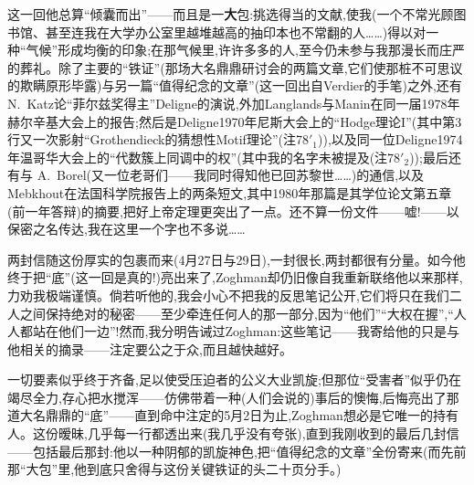 这一回他总算“倾囊而出”——而且是一\textbf{大}包:挑选得当的文献,使我(一个不常光顾图书馆、甚至连我在大学办公室里越堆越高的抽印本也不常翻的人……)得以对一种“气候”形成均衡的印象;在那气候里,许许多多的人,至今仍未参与我那漫长而庄严的葬礼。除了主要的“铁证”(那场大名鼎鼎研讨会的两篇文章,它们使那桩不可思议的欺瞒原形毕露)与另一篇“值得纪念的文章”(这一回出自Verdier的手笔)之外,还有 N.~Katz论“菲尔兹奖得主”Deligne的演说,外加Langlands与Manin在同一届1978年赫尔辛基大会上的报告;然后是Deligne1970年尼斯大会上的“Hodge理论I”(其中第3行又一次影射“Grothendieck的猜想性Motif理论”(注78$'_{1}$))\dmark{},以及同一位Deligne1974年温哥华大会上的“代数簇上同调中的权”(其中我的名字未被提及(注78$'_{2}$));最后还有与 A.~Borel(又一位老哥们——我同时得知他已回苏黎世……)的通信,以及Mebkhout在法国科学院报告上的两条短文,其中1980年那篇是其学位论文第五章(前一年答辩)的摘要,把好上帝定理更突出了一点。还不算一份文件——嘘!——以保密之名传达,我在这里一个字也不多说……

两封信随这份厚实的包裹而来(4月27日与29日),一封很长,两封都很有分量。如今他终于把“底”(这一回是真的!)亮出来了,Zoghman却仍旧像自我重新联络他以来那样,力劝我极端谨慎。倘若听他的,我会小心不把我的反思笔记公开,它们将只在我们二人之间保持绝对的秘密——至少牵连任何人的那一部分,因为“他们”“大权在握”,“人人都站在他们一边”!然而,我分明告诫过Zoghman:这些笔记——我寄给他的只是与他相关的摘录——注定要公之于众,而且越快越好。

一切要素似乎终于齐备,足以使受压迫者的公义大业凯旋;但那位“受害者”似乎仍在竭尽全力,存心把水搅浑——仿佛带着一种(人们会说的)事后的懊悔,后悔亮出了那道大名鼎鼎的“底”——直到命中注定的5月2日为止,Zoghman想必是它唯一的持有人。这份暧昧,几乎每一行都透出来(我几乎没有夸张),直到我刚收到的最后几封信——包括最后那封:他以一种阴郁的凯旋神色,把“值得纪念的文章”全份寄来(而先前那“大包”里,他到底只舍得与这份关键铁证的头二十页分手。)

